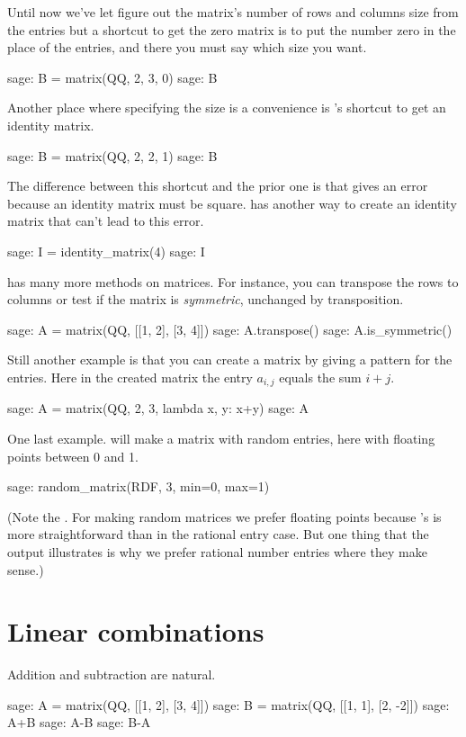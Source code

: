 Until now we've let \Sage{} figure out the matrix's 
number of rows and columns size from the entries but
a shortcut to get the zero matrix 
is to put the number zero in the place of the entries, and there you
must say which size you want.
\begin{sagecommandline}
sage: B = matrix(QQ, 2, 3, 0)                     
sage: B
\end{sagecommandline}
\noindent
Another place where specifying the size is a convenience is 
\Sage's shortcut to get an identity matrix.
\begin{sagecommandline}
sage: B = matrix(QQ, 2, 2, 1)
sage: B
\end{sagecommandline}
\noindent
The difference between this shortcut and the prior one is that 
 gives an error because 
an identity matrix must be square.
\Sage{} has another way to create an identity matrix 
that can't lead to this error.
\begin{sagecommandline}
sage: I = identity_matrix(4)
sage: I
\end{sagecommandline}

\Sage{} has many more methods on matrices.
For instance, you can transpose the rows to columns or test if the 
matrix is \textit{symmetric},
unchanged by transposition.
\begin{sagecommandline}
sage: A = matrix(QQ, [[1, 2], [3, 4]])
sage: A.transpose()
sage: A.is_symmetric()
\end{sagecommandline}
Still another example is that you can create a matrix by giving a pattern
for the entries.
Here in the created matrix the entry $a_{i,j}$ equals the sum
$i+j$.
\begin{sagecommandline}
sage: A = matrix(QQ, 2, 3, lambda x, y: x+y)
sage: A
\end{sagecommandline}
One last example.
\Sage{} will make a matrix with random entries, here
with floating points between 0 and 1.
\begin{sagecommandline}
sage: random_matrix(RDF, 3, min=0, max=1)
\end{sagecommandline}
(Note the .
For making random matrices we prefer floating points because
\Sage's  
is more straightforward than in the  
rational entry case.
But one thing that the output 
illustrates is why we prefer rational number entries where they
make sense.)




\section{Linear combinations}
Addition and subtraction are natural.
\begin{sagecommandline}
sage: A = matrix(QQ, [[1, 2], [3, 4]])
sage: B = matrix(QQ, [[1, 1], [2, -2]])
sage: A+B
sage: A-B
sage: B-A
\end{sagecommandline}

